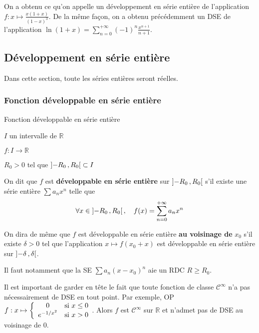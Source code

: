     On a obtenu ce qu’on appelle un développement en série entière de l’application $f : x \mapsto \frac{x(1+x)}{(1-x)^3}$. De la même façon, on a obtenu précédemment un DSE de l’application $\ln(1+x) = \sum_{n=0}^{+\infty} (-1)^n \frac{x^{n+1}}{n+1}$.

\subsection{Développement en série entière}

    Dans cette section, toute les séries entières seront réelles.

    \subsubsection{Fonction développable en série entière}

    \begin{defi}{Fonction développable en série entière}{}
        \begin{soit}
            \item $I$ un intervalle de $\mathbb{R}$
            \item $f : I \to \mathbb{R}$
            \item $R_0 > 0$ tel que $\left] -R_0 \, , R_0 \right[ \subset I$
        \end{soit}
        On dit que $f$ est \textbf{développable en série entière} sur $\left] -R_0 \, , R_0 \right[$ s’il existe une série entière $\sum a_n x^n$ telle que 
        \[ \forall x \in \left] -R_0 \, , R_0 \right[, \quad f(x) = \sum_{n=0}^{+\infty} a_n x^n \]

        On dira de même que $f$ est développable en série entière \textbf{au voisinage de} $x_0$ s’il existe $\delta > 0$ tel que l’application $x \longmapsto f(x_0 + x)$ est développable en série entière sur $\left] -\delta \, , \delta \right[$.
    \end{defi}

    Il faut notamment que la SE $\sum a_n (x-x_0)^n$ aie un RDC $R \geq R_0$. 

    Il est important de garder en tête le fait que toute fonction de classe $\mathcal{C}^{\infty}$ n’a pas nécessairement de DSE en tout point. Par exemple, OP $f : x \mapsto \sisi{0}{x \leq 0}{e^{-1/x^2}}{x > 0}$. Alors $f$ est $\mathcal{C}^{\infty}$ sur $\mathbb{R}$ et n’admet pas de DSE au voisinage de $0$.

